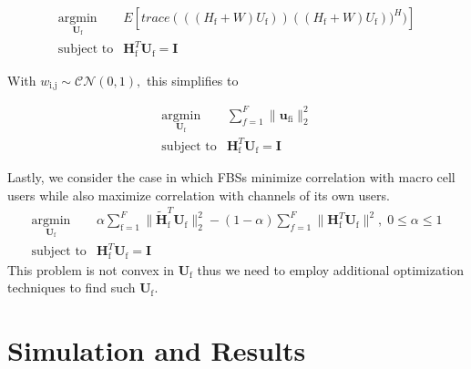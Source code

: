 \documentclass[12pt,a4paper]{report}
\begin{document}
    \begin{equation}
    \begin{array}{ll}
    \underset{\mathbf{U}_{\mathrm{f}} }{\text{argmin}}   & E[trace(((H_{\text{f}}+W)U_{\text{f}}))((H_{\text{f}}+W)U_{\text{f}}))^H)]
    \\
    \mbox{subject to} & \mathbf{H}_{\mathrm{f}}^T  \mathbf{U_{\mathrm{f}}} = \mathbf{I}
    \end{array}
    \label{e-opt-prob}
    \end{equation}

With $w_{\text{i,j}} \sim \mathcal{CN}(0,1),$ this simplifies to 

    \begin{equation}
    \begin{array}{ll}
    \underset{\mathbf{U}_{\mathrm{f}} }{\text{argmin}}   & \sum^F_{f=1} \|\mathbf{u_{\mathrm{fi}}}\|^2_2
    \\
    \mbox{subject to} & \mathbf{H}_{\mathrm{f}}^T  \mathbf{U_{\mathrm{f}}} = \mathbf{I}
    \end{array}
    \label{e-opt-prob}
    \end{equation}


\par
Lastly, we consider the case in which FBSs minimize correlation with macro cell users while also maximize correlation with channels of its own users. 
    \begin{equation}
    \begin{array}{ll}
    \underset{\mathbf{U}_{\mathrm{f}} }{\text{argmin}}   & \alpha\sum^F_{\text{f}=1} \|\mathbf{\tilde{H}}_{\mathrm{f}}^T  \mathbf{U_{\mathrm{f}}}\|^2_2
    -
    (1-\alpha)\sum^F_{f=1} \|\mathbf{H}_{\mathrm{f}}^T  \mathbf{U_{\mathrm{f}}}\|^2, \; 0\leq \alpha \leq 1
    \\
    \mbox{subject to} & \mathbf{H}_{\mathrm{f}}^T  \mathbf{U_{\mathrm{f}}} = \mathbf{I}
    \end{array}
    \label{e-opt-prob}
    \end{equation}
    This problem is not convex in $\mathbf{U}_{\mathrm{f}}$ thus we need to employ additional optimization techniques to find such $\mathbf{U}_{\mathrm{f}}$.


\chapter{Simulation and Results}\label{numerical}
\end{document}
